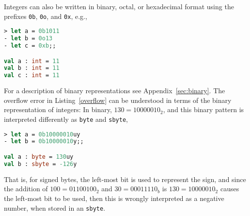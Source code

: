 Integers can also be written in binary, octal, or hexadecimal format using the prefixes \lstinline|0b|, \lstinline|0o|, and \lstinline|0x|, e.g.,
\begin{lstlisting}[language=fsharp,caption={fsharpi}]
> let a = 0b1011
- let b = 0o13
- let c = 0xb;;

val a : int = 11
val b : int = 11
val c : int = 11
\end{lstlisting}
For a description of binary representations see Appendix~\ref{sec:binary}. The overflow error in Listing~\ref{overflow} can be understood in terms of the binary representation of integers: In binary, $130=10000010_2$, and this binary pattern is interpreted differently as \lstinline{byte} and \lstinline{sbyte},
\begin{lstlisting}[language=fsharp,caption={fsharpi}]
> let a = 0b10000010uy
- let b = 0b10000010y;;

val a : byte = 130uy
val b : sbyte = -126y
\end{lstlisting}
That is, for signed bytes, the left-most bit is used to represent the sign, and since the addition of $100=01100100_2$ and $30=00011110_b$ is $130=10000010_2$ causes the left-most bit to be used, then this is wrongly interpreted as a negative number, when stored in an \lstinline{sbyte}.

